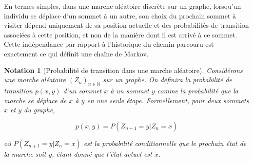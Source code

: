 \documentclass{article}
\theoremstyle{pasdepoint}
\theoremstyle{break}
\theoremstyle{pasdepoint}
\newtheorem*{notation}{Notation}
\begin{document}
En termes simples, dans une marche aléatoire discrète sur un graphe, lorsqu'un individu se déplace d'un sommet à un autre, son choix du prochain sommet à visiter dépend uniquement de sa position actuelle et des probabilités de transition associées à cette position, et non de la manière dont il est arrivé à ce sommet. Cette indépendance par rapport à l'historique du chemin parcouru est exactement ce qui définit une chaîne de Markov.

\begin{notation}[Probabilité de transition dans une marche aléatoire]
    Considérons une marche aléatoire \( (Z_n)_{n \in \mathbb{N}} \) sur un graphe. On définira la probabilité de transition \( p(x, y) \) d'un sommet \( x \) à un sommet \( y \) comme la probabilité que la marche se déplace de \( x \) à \( y \) en une seule étape. Formellement, pour deux sommets \( x \) et \( y \) du graphe,

    \[
    p(x, y) = P(Z_{n+1} = y | Z_n = x)
    \]

    où \( P(Z_{n+1} = y | Z_n = x) \) est la probabilité conditionnelle que le prochain état de la marche soit \( y \), étant donné que l'état actuel est \( x \).
\end{notation}
\end{document}
